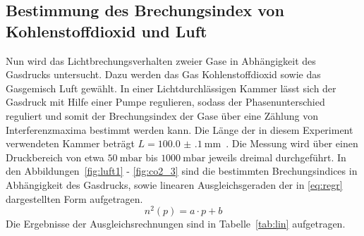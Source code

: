 \subsection{Bestimmung des Brechungsindex von Kohlenstoffdioxid und Luft}
%
Nun wird das Lichtbrechungsverhalten zweier Gase in Abhängigkeit des Gasdrucks
untersucht. Dazu werden das Gas Kohlenstoffdioxid sowie das Gasgemisch Luft
gewählt. In einer Lichtdurchlässigen Kammer lässt sich der Gasdruck mit Hilfe
einer Pumpe regulieren, sodass der Phasenunterschied reguliert und somit der
Brechungsindex der Gase über eine Zählung von Interferenzmaxima bestimmt werden
kann. Die Länge der in diesem Experiment verwendeten Kammer beträgt
$L=\SI{100.0(1)}{\milli\meter}$~\cite{V64}. Die Messung wird über einen
Druckbereich von etwa $\SI{50}{\milli\bar}$ bis $\SI{1000}{\milli\bar}$ jeweils
dreimal durchgeführt. In den Abbildungen~\ref{fig:luft1} - \ref{fig:co2_3} sind die bestimmten
Brechungsindices in Abhängigkeit des Gasdrucks, sowie linearen Ausgleichsgeraden der in \eqref{eq:regr} dargestellten Form aufgetragen.
%
\begin{equation}
  n^2(p)=a\cdot p + b
  \label{eq:regr}
\end{equation}
%
Die Ergebnisse der Ausgleichsrechnungen sind in Tabelle~\ref{tab:lin} aufgetragen.

